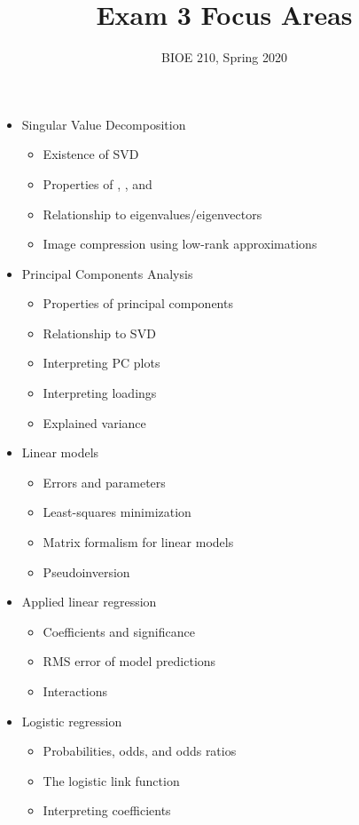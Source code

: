 \documentclass[12pt,pal,wide]{pajarticle}
\title{Exam 3 Focus Areas}
\author{BIOE 210, Spring 2020}
\date{}
\begin{document}
\maketitle
\thispagestyle{empty}

\begin{itemize}
	\item Singular Value Decomposition
	\begin{itemize}
		\item Existence of SVD
		\item Properties of \VU, \VSigma, and \VV
		\item Relationship to eigenvalues/eigenvectors
		\item Image compression using low-rank approximations
	\end{itemize}
\item Principal Components Analysis
	\begin{itemize}
	\item Properties of principal components
	\item Relationship to SVD
	\item Interpreting PC plots
	\item Interpreting loadings
	\item Explained variance
	\end{itemize}
\item Linear models
	\begin{itemize}
	\item Errors and parameters
	\item Least-squares minimization
	\item Matrix formalism for linear models
	\item Pseudoinversion
	\end{itemize}
\item Applied linear regression
	\begin{itemize}
	\item Coefficients and significance
	\item RMS error of model predictions
	\item Interactions
	\end{itemize}
\item Logistic regression
	\begin{itemize}
	\item Probabilities, odds, and odds ratios
	\item The logistic link function
	\item Interpreting coefficients
	\end{itemize}
\end{itemize}
\end{document}
